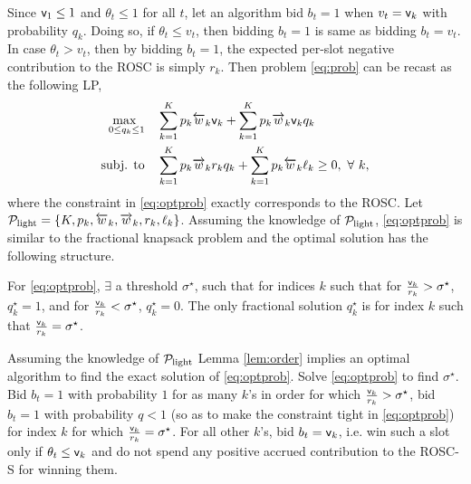 Since ${\mathsf{v}}_1\le 1$ and $\theta_t \le 1$ for all $t$, let an algorithm bid $b_t = 1$ when $v_t={\mathsf{v}}_k$ with probability $q_k$. 
Doing so, if $\theta_t \le v_t$, then bidding $b_t = 1$ is same as bidding $b_t = v_t$. In case $\theta_t > v_t$, then by bidding $b_t=1$, 
the expected per-slot negative contribution to the ROSC is simply $r_k$. %
  Then problem \eqref{eq:prob} can be recast as the following LP, 
\begin{align}\nonumber
\max_{  \  0\le q_k \le 1} & \quad \sum_{k=1}^K p_k\overleftarrow{w}_k {\mathsf{v}}_k + \sum_{k=1}^K p_k\overrightarrow{w}_k {\mathsf{v}}_k  q_k \\ \label{eq:optprob}
\text{subj. to} & \quad  \sum_{k=1}^K p_k\overrightarrow{w}_k r_k q_k + \sum_{k=1}^K p_k \overleftarrow{w}_k \ell_k \ge 0, \ \forall \ k,
\end{align}
where the constraint in \eqref{eq:optprob} exactly corresponds to the ROSC. 
Let $\mathcal{P}_{\text{light}} =\{K, p_k, \overleftarrow{w}_k, \overrightarrow{w}_k, r_k, \ell_k\}$.
 Assuming the knowledge of $\mathcal{P}_{\text{light}}$, \eqref{eq:optprob} is similar to the fractional knapsack problem \cite{vaze2023online} and the optimal solution has the following structure. 

\begin{lemma}\label{lem:order}
For \eqref{eq:optprob},  $\exists$ a threshold $\sigma^\star$, such that for indices $k$ such that for $\frac{ {\mathsf{v}}_k}{r_k} > \sigma^\star$, $q_k^\star = 1$, and for $\frac{ {\mathsf{v}}_k}{r_k} < \sigma^\star$, $q_k^\star = 0$. The only fractional solution $q_k^\star$ is for index $k$ such that $\frac{ {\mathsf{v}}_k}{r_k}=\sigma^\star$.
\end{lemma}
 Assuming the knowledge of $\mathcal{P}_{\text{light}}$
Lemma \ref{lem:order} implies an optimal algorithm to find the exact solution of \eqref{eq:optprob}. Solve \eqref{eq:optprob} to find $\sigma^\star$. 
Bid $b_t=1$ with probability $1$ for as many $k$'s in order for which $\frac{{\mathsf{v}}_k}{r_k} > \sigma^\star$, bid $b_t=1$ with probability $q<1$ (so as to make the constraint tight in \eqref{eq:optprob}) for index $k$ for which
 $\frac{{\mathsf{v}}_k}{r_k} = \sigma^\star$. For all other $k$'s,  bid $b_t={\mathsf{v}}_k$, i.e. win such a slot only if $\theta_t \le {\mathsf{v}}_k$ and do not spend any positive accrued contribution to the ROSC-S for winning them.


